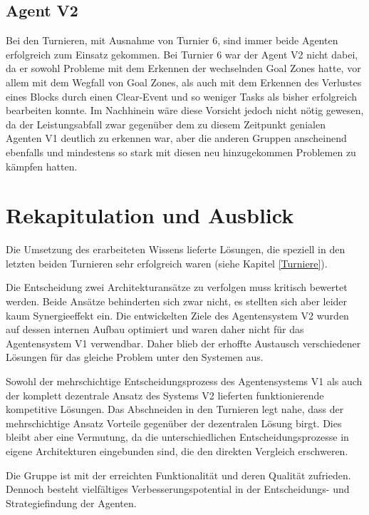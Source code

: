 \documentclass[runningheads]{llncs}
\begin{document}
\subsection{Agent V2}
Bei den Turnieren, mit Ausnahme von Turnier 6, sind immer beide Agenten erfolgreich zum Einsatz gekommen. Bei Turnier 6 war der Agent V2 nicht dabei, da er sowohl Probleme mit dem Erkennen der wechselnden Goal Zones hatte, vor allem mit dem Wegfall von Goal Zones, als auch mit dem Erkennen des Verlustes eines Blocks durch einen Clear-Event und so weniger Tasks als bisher erfolgreich bearbeiten konnte. Im Nachhinein wäre diese Vorsicht jedoch nicht nötig gewesen, da der Leistungsabfall zwar gegenüber dem zu diesem Zeitpunkt genialen Agenten V1 deutlich zu erkennen war, aber die anderen Gruppen anscheinend ebenfalls und mindestens so stark mit diesen neu hinzugekommen Problemen zu kämpfen hatten.

\section{Rekapitulation und Ausblick}
Die Umsetzung des erarbeiteten Wissens lieferte Lösungen, die speziell in den letzten beiden Turnieren sehr erfolgreich waren (siehe Kapitel \ref{Turniere}).


Die Entscheidung zwei Architekturansätze zu verfolgen muss kritisch bewertet werden. Beide Ansätze behinderten sich zwar nicht, es stellten sich aber leider kaum Synergieeffekt ein. Die entwickelten Ziele des Agentensystem V2 wurden auf dessen internen Aufbau optimiert und waren daher nicht für das Agentensystem V1 verwendbar. Daher blieb der erhoffte Austausch verschiedener Lösungen für das gleiche Problem unter den Systemen aus.

Sowohl der mehrschichtige Entscheidungsprozess des Agentensystems V1 als auch der komplett dezentrale Ansatz des Systems V2 lieferten funktionierende kompetitive Lösungen. Das Abschneiden in den Turnieren legt nahe, dass der mehrschichtige Ansatz Vorteile gegenüber der dezentralen Lösung birgt. Dies bleibt aber eine Vermutung, da die unterschiedlichen Entscheidungsprozesse in eigene Architekturen eingebunden sind, die den direkten Vergleich erschweren.

Die Gruppe ist mit der erreichten Funktionalität und deren Qualität zufrieden. Dennoch besteht vielfältiges Verbesserungspotential in der Entscheidungs- und Strategiefindung der Agenten.
\end{document}
